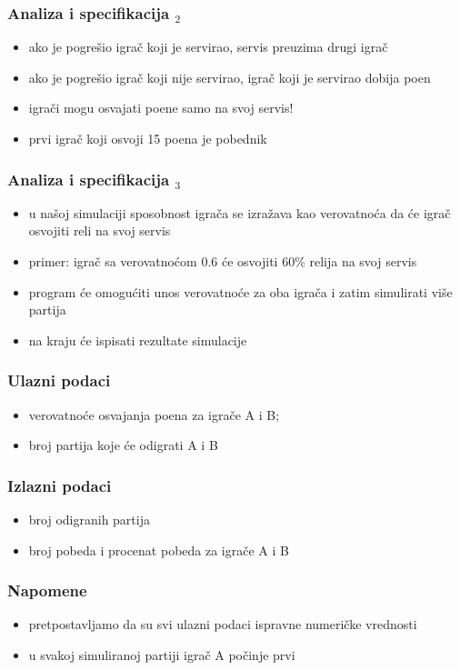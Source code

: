 \documentclass[utf8,compress]{beamer}
\begin{document}
\begin{frame}
  \frametitle{Analiza i specifikacija $_2$}
  \begin{itemize}
    \item ako je pogrešio igrač koji je servirao, servis preuzima drugi igrač
    \item ako je pogrešio igrač koji nije servirao, igrač koji je servirao dobija poen
    \item igrači mogu osvajati poene samo na svoj servis!
    \item prvi igrač koji osvoji 15 poena je pobednik
  \end{itemize}
\end{frame}

\begin{frame}
  \frametitle{Analiza i specifikacija $_3$}
  \begin{itemize}
    \item u našoj simulaciji sposobnost igrača se izražava kao verovatnoća da će igrač osvojiti reli na svoj servis
    \item primer: igrač sa verovatnoćom 0.6 će osvojiti 60\% relija na svoj servis
    \item program će omogućiti unos verovatnoće za oba igrača i zatim simulirati više partija
    \item na kraju će ispisati rezultate simulacije
  \end{itemize}
\end{frame}

\begin{frame}
  \frametitle{Ulazni podaci}
  \begin{itemize}
    \item verovatnoće osvajanja poena za igrače A i B; 
    \item broj partija koje će odigrati A i B
  \end{itemize}
\end{frame}

\begin{frame}
  \frametitle{Izlazni podaci}
  \begin{itemize}
    \item broj odigranih partija
    \item broj pobeda i procenat pobeda za igrače A i B
  \end{itemize}
\end{frame}

\begin{frame}
  \frametitle{Napomene}
  \begin{itemize}
    \item pretpostavljamo da su svi ulazni podaci ispravne numeričke vrednosti
    \item u svakoj simuliranoj partiji igrač A počinje prvi
  \end{itemize}
\end{frame}
\end{document}
